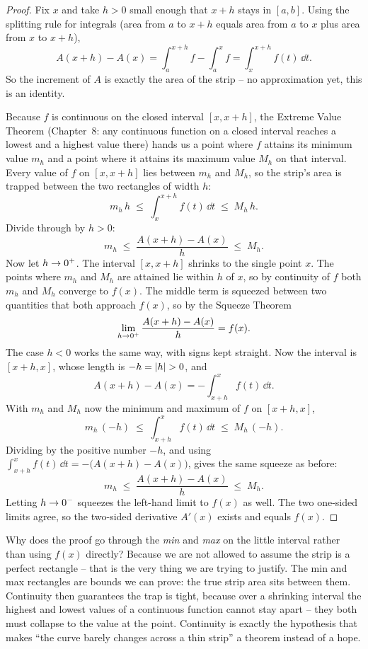 \begin{proof}
Fix $x$ and take $h>0$ small enough that $x+h$ stays in $[a,b]$. Using the
splitting rule for integrals (area from $a$ to $x+h$ equals area from $a$ to $x$
plus area from $x$ to $x+h$),
\[
  A(x+h)-A(x)
  = \int_a^{x+h} f - \int_a^{x} f
  = \int_x^{x+h} f(t)\,\dd t .
\]
So the increment of $A$ is exactly the area of the strip -- no approximation yet,
this is an identity.

Because $f$ is continuous on the closed interval $[x,x+h]$, the Extreme Value
Theorem (Chapter~8: any continuous function on a closed interval reaches a
lowest and a highest value there) hands us a point where $f$
attains its minimum value $m_h$ and a point where it attains its maximum value
$M_h$ on that interval. Every value of $f$ on $[x,x+h]$ lies between $m_h$ and
$M_h$, so the strip's area is trapped between the two rectangles of width $h$:
\[
  m_h\, h \;\le\; \int_x^{x+h} f(t)\,\dd t \;\le\; M_h\, h .
\]
Divide through by $h>0$:
\[
  m_h \;\le\; \frac{A(x+h)-A(x)}{h} \;\le\; M_h .
\]
Now let $h\to 0^+$. The interval $[x,x+h]$ shrinks to the single point $x$. The
points where $m_h$ and $M_h$ are attained lie within $h$ of $x$, so by continuity
of $f$ both $m_h$ and $M_h$ converge to $f(x)$. The middle term is squeezed
between two quantities that both approach $f(x)$, so by the Squeeze Theorem
\[
  \lim_{h\to 0^+}\frac{A(x+h)-A(x)}{h} = f(x).
\]
The case $h<0$ works the same way, with signs kept straight. Now the interval
is $[x+h,x]$, whose length is $-h=\lvert h\rvert>0$, and
\[
  A(x+h)-A(x) = -\int_{x+h}^{x} f(t)\,\dd t .
\]
With $m_h$ and $M_h$ now the minimum and maximum of $f$ on $[x+h,x]$,
\[
  m_h\,(-h) \;\le\; \int_{x+h}^{x} f(t)\,\dd t \;\le\; M_h\,(-h).
\]
Dividing by the positive number $-h$, and using
$\int_{x+h}^{x} f(t)\,\dd t = -\bigl(A(x+h)-A(x)\bigr)$, gives the same squeeze
as before:
\[
  m_h \;\le\; \frac{A(x+h)-A(x)}{h} \;\le\; M_h .
\]
Letting $h\to 0^-$ squeezes the left-hand limit to $f(x)$ as well. The two
one-sided limits agree, so the two-sided derivative $A'(x)$ exists and equals
$f(x)$.
\end{proof}

\begin{whybox}
Why does the proof go through the \emph{min} and \emph{max} on the little
interval rather than using $f(x)$ directly? Because we are not allowed to assume the
strip is a perfect rectangle -- that is the very thing we are trying to justify.
The min and max rectangles are bounds we can prove: the true strip area sits
between them. Continuity then
guarantees the trap is tight, because over a shrinking interval the highest and
lowest values of a continuous function cannot stay apart -- they both must
collapse to the value at the point. Continuity is exactly the hypothesis that
makes ``the curve barely changes across a thin strip'' a theorem instead of a
hope.
\end{whybox}

